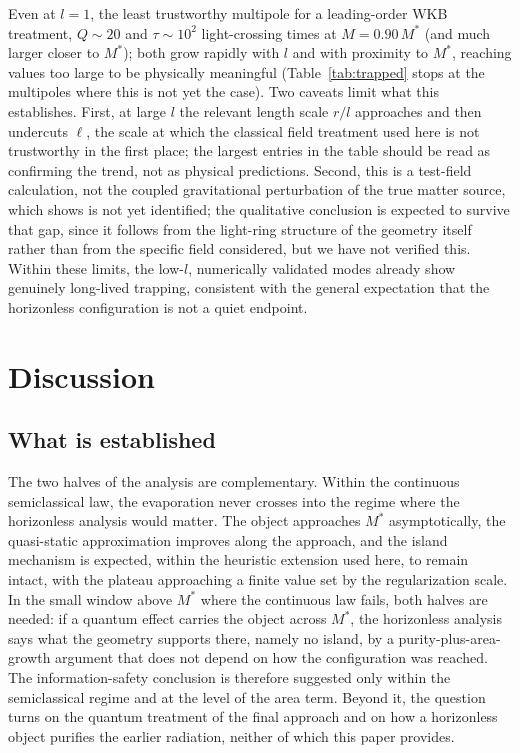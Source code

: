 \documentclass[11pt]{article}
\begin{document}
Even at $l=1$, the least trustworthy multipole for a leading-order WKB treatment, $Q\sim20$ and $\tau\sim10^{2}$ light-crossing times at $M=0.90\,M^*$ (and much larger closer to $M^*$); both grow rapidly with $l$ and with proximity to $M^*$, reaching values too large to be physically meaningful (Table~\ref{tab:trapped} stops at the multipoles where this is not yet the case). Two caveats limit what this establishes. First, at large $l$ the relevant length scale $r/l$ approaches and then undercuts $\ell$, the scale at which the classical field treatment used here is not trustworthy in the first place; the largest entries in the table should be read as confirming the trend, not as physical predictions. Second, this is a test-field calculation, not the coupled gravitational perturbation of the true matter source, which \citet{PaperB} shows is not yet identified; the qualitative conclusion is expected to survive that gap, since it follows from the light-ring structure of the geometry itself rather than from the specific field considered, but we have not verified this. Within these limits, the low-$l$, numerically validated modes already show genuinely long-lived trapping, consistent with the general expectation that the horizonless configuration is not a quiet endpoint.

\section{Discussion}
\label{sec:disc}

\subsection{What is established}

The two halves of the analysis are complementary. Within the continuous semiclassical law, the evaporation never crosses into the regime where the horizonless analysis would matter. The object approaches $M^*$ asymptotically, the quasi-static approximation improves along the approach, and the island mechanism is expected, within the heuristic extension used here, to remain intact, with the plateau approaching a finite value set by the regularization scale. In the small window above $M^*$ where the continuous law fails, both halves are needed: if a quantum effect carries the object across $M^*$, the horizonless analysis says what the geometry supports there, namely no island, by a purity-plus-area-growth argument that does not depend on how the configuration was reached. The information-safety conclusion is therefore suggested only within the semiclassical regime and at the level of the area term. Beyond it, the question turns on the quantum treatment of the final approach and on how a horizonless object purifies the earlier radiation, neither of which this paper provides.
\end{document}
